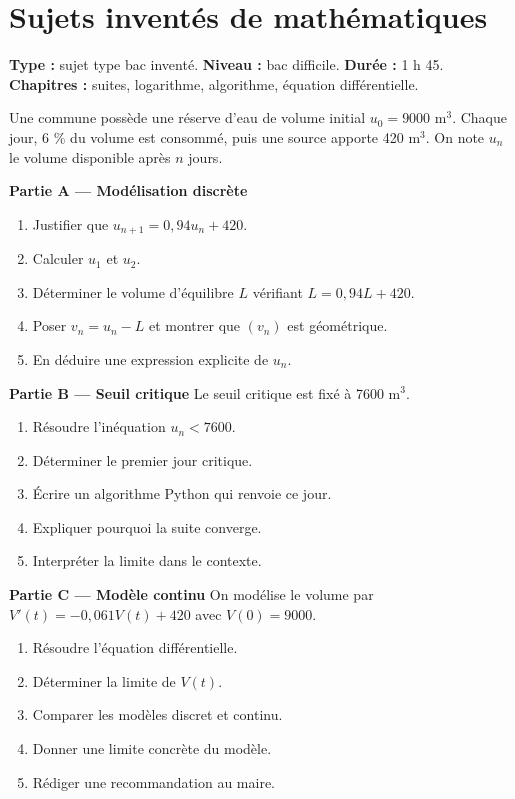 \documentclass[11pt,a4paper]{article}
\begin{document}
\section{Sujets inventés de mathématiques}

\hypertarget{M-LONG-01}{}
\begin{sujettype}
\textbf{Type :} sujet type bac inventé.  
\textbf{Niveau :} bac difficile.  
\textbf{Durée :} 1 h 45.  
\textbf{Chapitres :} suites, logarithme, algorithme, équation différentielle.  

Une commune possède une réserve d'eau de volume initial $u_0=9000$ m$^3$. Chaque jour, 6 \% du volume est consommé, puis une source apporte 420 m$^3$. On note $u_n$ le volume disponible après $n$ jours.

\textbf{Partie A — Modélisation discrète}
\begin{enumerate}
  \item Justifier que $u_{n+1}=0{,}94u_n+420$.
  \item Calculer $u_1$ et $u_2$.
  \item Déterminer le volume d'équilibre $L$ vérifiant $L=0{,}94L+420$.
  \item Poser $v_n=u_n-L$ et montrer que $(v_n)$ est géométrique.
  \item En déduire une expression explicite de $u_n$.
\end{enumerate}

\textbf{Partie B — Seuil critique}
Le seuil critique est fixé à 7600 m$^3$.
\begin{enumerate}
  \item Résoudre l'inéquation $u_n<7600$.
  \item Déterminer le premier jour critique.
  \item Écrire un algorithme Python qui renvoie ce jour.
  \item Expliquer pourquoi la suite converge.
  \item Interpréter la limite dans le contexte.
\end{enumerate}

\textbf{Partie C — Modèle continu}
On modélise le volume par $V'(t)=-0{,}061V(t)+420$ avec $V(0)=9000$.
\begin{enumerate}
  \item Résoudre l'équation différentielle.
  \item Déterminer la limite de $V(t)$.
  \item Comparer les modèles discret et continu.
  \item Donner une limite concrète du modèle.
  \item Rédiger une recommandation au maire.
\end{enumerate}
\end{sujettype}
\end{document}
